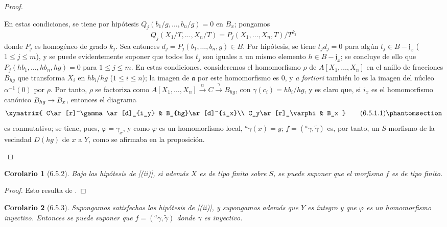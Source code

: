 \documentclass[oneside]{amsart}
\theoremstyle{ega-env-style}
\theoremstyle{ega-thm-env-style}
\newtheorem*{corollary}{Corolario}
\theoremstyle{ega-defn-env-style}
\def\leq{\leqslant}                 %
\def\setmin{-}                      %
\renewcommand{\to}{\mathchoice{\longrightarrow}{\rightarrow}{\rightarrow}{\rightarrow}}
\newcommand{\oldpage}[2][]{{\marginnote{\normalfont{\textbf{#1}~|~#2}}}\ignorespaces}
\let\EGAOriginalLabel\label
\renewcommand{\label}[1]{\phantomsection\EGAOriginalLabel{#1}}
\begin{document}
\begin{proof}
\begin{enumerate}
    En estas condiciones, se tiene por hipótesis $Q_j(b_1/g,\ldots,b_n/g)=0$ en $B_x$; pongamos
    \[
      Q_j(X_1/T,\ldots,X_n/T)
      =P_j(X_1,\ldots,X_n,T)/T^{k_j}
    \]
    donde $P_j$ es homogéneo de grado $k_j$.
    Sea entonces $d_j=P_j(b_1,\ldots,b_n,g)\in B$.
    Por hipótesis, se tiene $t_jd_j=0$ para algún $t_j\in B\setmin\mathfrak{j}_x$ ($1\leq j\leq m$), y se puede evidentemente suponer que todos los $t_j$
\oldpage[I]{151}
    son iguales a un mismo elemento $h\in B\setmin\mathfrak{j}_x$;
    se concluye de ello que $P_j(hb_1,\ldots,hb_n,hg)=0$ para $1\leq j\leq m$.
    En estas condiciones, consideremos el homomorfismo $\rho$ de $A[X_1,\ldots,X_n]$ en el anillo de fracciones $B_{hg}$ que transforma $X_i$ en $hb_i/hg$ ($1\leq i\leq n$);
    la imagen de $\mathfrak{a}$ por este homomorfismo es 0, y \emph{a fortiori} también lo es la imagen del núcleo $\alpha^{-1}(0)$ por $\rho$.
    Por tanto, $\rho$ se factoriza como $A[X_1,\ldots,X_n]\xrightarrow{\alpha}C\xrightarrow{\gamma}B_{hg}$, con $\gamma(c_i)=hb_i/hg$, y es claro que, si $i_x$ es el homomorfismo canónico $B_{hg}\to B_x$, entonces el diagrama
    \[
      \xymatrix{
        C\ar[r]^\gamma\ar[d]_{i_y} & B_{hg}\ar[d]^{i_x}\\
        C_y\ar[r]_\varphi & B_x
      }
      \tag{6.5.1.1}\label{I.6.5.1.1-fr}
    \]
    es conmutativo; se tiene, pues, $\varphi=\gamma_x$, y como $\varphi$ es un homomorfismo local, ${}^a\gamma(x)=y$;
    $f=({}^a\gamma,\widetilde{\gamma})$ es, por tanto, un $S$-morfismo de la vecindad $D(hg)$ de $x$ a $Y$, como se afirmaba en la proposición.
\end{enumerate}
\end{proof}

\begin{corollary}[6.5.2]
\label{I.6.5.2}
Bajo las hipótesis de [(ii)], si además $X$ es de tipo finito sobre $S$, se puede suponer que el morfismo $f$ es de tipo finito.
\end{corollary}

\begin{proof}
Esto resulta de .
\end{proof}

\begin{corollary}[6.5.3]
\label{I.6.5.3}
Supongamos satisfechas las hipótesis de [(ii)], y supongamos además que $Y$ es íntegro y que $\varphi$ es un homomorfismo inyectivo.
Entonces se puede suponer que $f=({}^a\gamma,\widetilde{\gamma})$ donde $\gamma$ es inyectivo.
\end{corollary}
\end{document}
